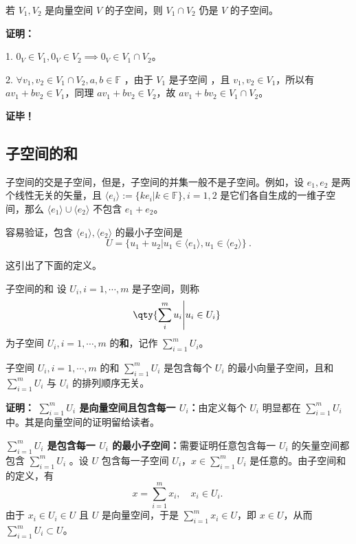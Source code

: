 \begin{theorem}{}\label{the_SubSpc_1}
若 $V_1, V_2$ 是向量空间 $V$ 的子空间，则 $V_1 \cap V_2$ 仍是 $V$ 的子空间。
\end{theorem}
\textbf{证明：}

1. $0_V \in V_1, 0_V \in V_2 \implies 0_V \in V_1 \cap V_2$。

2. $\forall v_1,v_2 \in V_1 \cap V_2, a, b \in \mathbb{F}$ ，由于 $V_1$ 是子空间 ，且 $v_1, v_2 \in V_1$，所以有 $a v_1 + b v_2 \in V_1$，同理 $a v_1 + b v_2 \in V_2$，故 $a v_1 + b v_2 \in V_1 \cap V_2$。

\textbf{证毕！}

\subsection{子空间的和}
子空间的交是子空间，但是，子空间的并集一般不是子空间。例如，设 $e_1,e_2$ 是两个线性无关的矢量，且 $\langle e_i\rangle:=\{k e_i|k\in\mathbb F\},i=1,2$ 是它们各自生成的一维子空间，那么 $\langle e_1\rangle\cup \langle e_2\rangle$ 不包含 $e_1+e_2$。

容易验证，包含 $\langle e_1\rangle,\langle e_2\rangle$ 的最小子空间是
\begin{equation}
U=\{u_1+u_2|u_1\in \langle e_1\rangle,u_1\in\langle e_2\rangle\}~.
\end{equation}

这引出了下面的定义。
\begin{definition}{子空间的和}\label{def_SubSpc_1}
设 $U_i,i=1,\cdots,m$ 是子空间，则称
\begin{equation}
\qty{\sum_{i}^m u_i\Bigg|u_i\in U_i}~
\end{equation}
为子空间 $U_i,i=1,\cdots,m$ 的\textbf{和}，记作 $\sum_{i=1}^m U_i$。
\end{definition}

\begin{theorem}{}
子空间 $U_i,i=1,\cdots,m$ 的和 $\sum_{i=1}^m U_i$ 是包含每个 $U_i$ 的最小向量子空间，且和 $\sum_{i=1}^m U_i$ 与 $U_i$ 的排列顺序无关。
\end{theorem}
\textbf{证明：} \textbf{$\sum_{i=1}^m U_i$ 是向量空间且包含每一 $U_i$：}由定义每个 $U_i$ 明显都在 $\sum_{i=1}^m U_i$ 中。其是向量空间的证明留给读者。

\textbf{$\sum_{i=1}^m U_i$ 是包含每一 $U_i$ 的最小子空间：}需要证明任意包含每一 $U_i$ 的矢量空间都包含 $\sum_{i=1}^m U_i$ 。设 $U$ 包含每一子空间 $U_i$，$x\in \sum_{i=1}^m U_i$ 是任意的。由子空间和的定义，有
\begin{equation}
x=\sum_{i=1}^m x_i,\quad x_i\in U_i.~
\end{equation}
由于 $x_i\in U_i\in U$ 且 $U$ 是向量空间，于是 $\sum_{i=1}^m x_i\in U$，即 $x\in U$，从而 $\sum_{i=1}^m U_i\subset U$。


